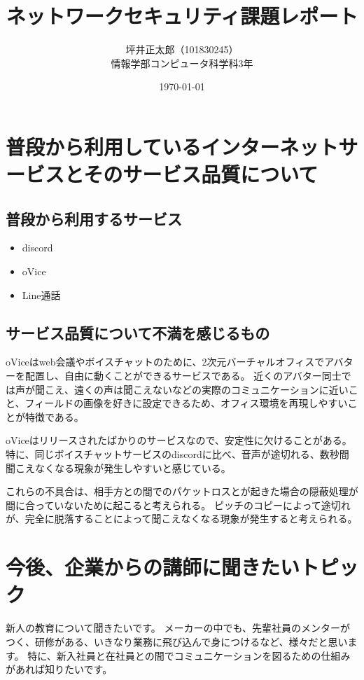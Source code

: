 \documentclass[a4paper,10pt]{jsarticle}
\begin{document}
\title{ネットワークセキュリティ課題レポート}
\author{坪井正太郎（101830245）\\情報学部コンピュータ科学科3年}
\date{\today}
\maketitle
\section{普段から利用しているインターネットサービスとそのサービス品質について}
\subsection{普段から利用するサービス}
\begin{itemize}
  \item discord
  \item oVice
  \item Line通話
\end{itemize}

\subsection{サービス品質について不満を感じるもの}
oViceはweb会議やボイスチャットのために、2次元バーチャルオフィスでアバターを配置し、自由に動くことができるサービスである。
近くのアバター同士では声が聞こえ、遠くの声は聞こえないなどの実際のコミュニケーションに近いこと、フィールドの画像を好きに設定できるため、オフィス環境を再現しやすいことが特徴である。

oViceはリリースされたばかりのサービスなので、安定性に欠けることがある。
特に、同じボイスチャットサービスのdiscordに比べ、音声が途切れる、数秒間聞こえなくなる現象が発生しやすいと感じている。

これらの不具合は、相手方との間でのパケットロスとが起きた場合の隠蔽処理が間に合っていないために起こると考えられる。
ピッチのコピーによって途切れが、完全に脱落することによって聞こえなくなる現象が発生すると考えられる。

\section{今後、企業からの講師に聞きたいトピック}
新人の教育について聞きたいです。
メーカーの中でも、先輩社員のメンターがつく、研修がある、いきなり業務に飛び込んで身につけるなど、様々だと思います。
特に、新入社員と在社員との間でコミュニケーションを図るための仕組みがあれば知りたいです。
\end{document}
